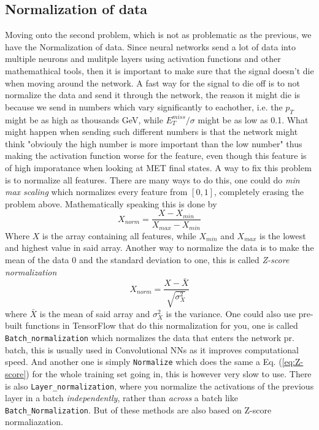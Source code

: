 \documentclass[14pt, a4paper]{book}
\begin{document}
\subsection{Normalization of data}\label{sec:normie_NN}
Moving onto the second problem, which is not as problematic as the previous, we have the Normalization of data. Since neural networks send a lot of data into multiple neurons and mulitple layers using activation functions and other mathemathical tools, then it is important to make sure that the signal doesn't die when moving around the network. A fast way for the signal to die off is to not normalize the data and send it through the network, the reason it might die is because we send in numbers which vary significantly to eachother, i.e. the $p_{T}$ might be as high as thousands GeV, while $E_T^{miss}/\sigma$ might be as low as 0.1. What might happen when sending such different numbers is that the network might think "obviouly the high number is more important than the low number" thus making the activation function worse for the feature, even though this feature is of high imporatance when looking at MET final states.
A way to fix this problem is to normalize all features. There are many ways to do this, one could do \textit{min max scaling} which normalizes every feature from $[0,1]$, completely erasing the problem above. Mathematically speaking this is done by
\begin{equation}\label{eq:minmax}
   X_{norm} = \frac{X - X_{min}}{X_{max}-X_{min}}
\end{equation}
Where $X$ is the array containing all features, while $X_{min}$ and $X_{max}$ is the lowest and highest value in said array. Another way to normalize the data is to make the mean of the data 0 and the standard deviation to one, this is called \textit{Z-score normalization} 
\begin{equation}\label{eq:Z-score}
   X_{norm} = \frac{X - \bar{X}}{\sqrt{\sigma_X^2}}
\end{equation}
where $\bar{X}$ is the mean of said array and $\sigma_X^2$ is the variance. One could also use pre-built functions in TensorFlow that do this normalization for you, one is called \verb|Batch_normalization| which normalizes the data that enters the network pr. batch, this is usually used in Convolutional NNs as it improves computational speed. 
And another one is simply \verb|Normalize| which does the same a Eq. (\ref{eq:Z-score}) for the whole training set going in, this is however very slow to use. There is also \verb|Layer_normalization|, where you normalize the activations of the previous layer in a batch \textit{independently}, rather than \textit{across} a batch like \verb|Batch_Normalization|. But of these methods are also based on Z-score normaliazation. \\
\end{document}

